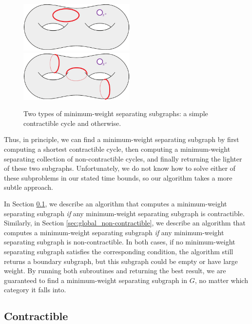 \documentclass[letterpaper,review]{siamart190516}
\def\knote#1{\textcolor{olive}{Kyle: #1}}
\begin{document}
{\begin{figure}[ht]
\centering
\includegraphics[height=1in]{Fig/shortcon2}\qquad
\includegraphics[height=1in]{Fig/homologous4}
\caption{Two types of minimum-weight separating subgraphs: a simple contractible cycle and otherwise.}
\label{fig:global_cases}
\end{figure}

Thus, in principle, we can find a minimum-weight separating subgraph by first computing a shortest
contractible cycle, then computing a minimum-weight separating collection of non-contractible
cycles, and finally returning the lighter of these two subgraphs.
Unfortunately, we do not know how to solve either of these subproblems in our stated time bounds, so our algorithm takes a more subtle approach. 

In Section \ref{sec:global_contractible}, we describe an algorithm that computes a minimum-weight separating subgraph \emph{if} any minimum-weight separating subgraph is contractible.  Similarly, in Section \ref{sec:global_non-contractible}, we describe an algorithm that computes a minimum-weight separating subgraph \emph{if} any minimum-weight separating subgraph is non-contractible.  In both cases, if no minimum-weight separating subgraph satisfies the corresponding condition, the algorithm still returns a boundary subgraph, but this subgraph could be empty or have large weight.  By running both subroutines and returning the best result, we are guaranteed to find a minimum-weight separating subgraph in $G$, no matter which category it falls into.



\subsection{Contractible}
\label{sec:global_contractible}

}
\end{document}
